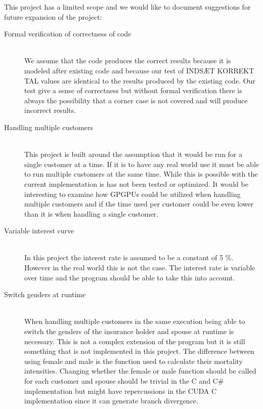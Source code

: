 This project has a limited scope and we would like to document suggestions for future expansion of the project:

\begin{description}
	
\item[Formal verification of correctness of code] \hfill \\
	We assume that the code produces the correct results because it is modeled after existing code and because our test of INDSÆT KORREKT TAL values are identical to the results produced by the existing code. Our test give a sense of correctness but without formal verification there is always the possibility that a corner case is not covered and will produce incorrect results. \\

\item[Handling multiple customers] \hfill \\
This project is built around the assumption that it would be run for a single customer at a time. If it is to have any real world use it must be able to run multiple customers at the same time. While this is possible with the current implementation is has not been tested or optimized. It would be interesting to examine how GPGPUs could be utilized when handling multiple customers and if the time used per customer could be even lower than it is when handling a single customer. \\

\item[Variable interest curve] \hfill \\
In this project the interest rate is assumed to be a constant of 5 \%. However in the real world this is not the case. The interest rate is variable over time and the program should be able to take this into account. \\

\item[Switch genders at runtime] \hfill \\
When handling multiple customers in the same execution being able to switch the genders of the insurance holder and spouse at runtime is necessary. This is not a complex extension of the program but it is still something that is not implemented in this project. The difference between using female and male is the function used to calculate their mortality intensities. Changing whether the female or male function should be called for each customer and spouse should be trivial in the C and C\# implementation but might have repercussions in the CUDA C implementation since it can generate branch divergence. \\


\end{description}
